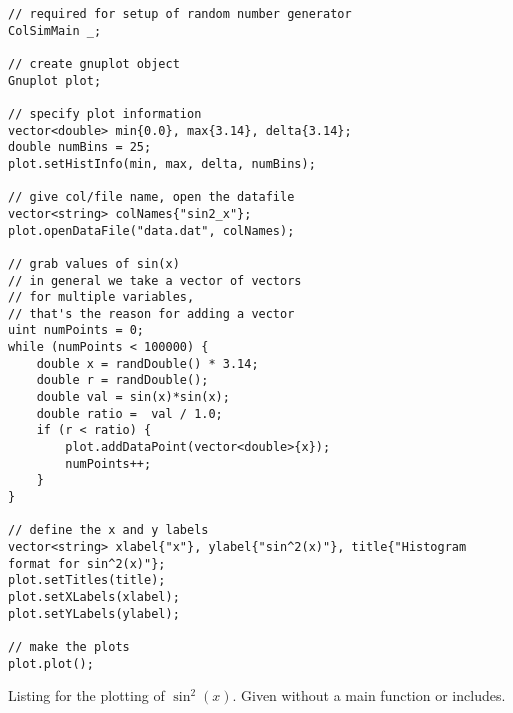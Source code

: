\begin{listing}[ht!]
\begin{verbatim}
// required for setup of random number generator
ColSimMain _;

// create gnuplot object
Gnuplot plot;

// specify plot information
vector<double> min{0.0}, max{3.14}, delta{3.14};
double numBins = 25;
plot.setHistInfo(min, max, delta, numBins);

// give col/file name, open the datafile
vector<string> colNames{"sin2_x"};
plot.openDataFile("data.dat", colNames);

// grab values of sin(x)
// in general we take a vector of vectors
// for multiple variables,
// that's the reason for adding a vector
uint numPoints = 0;
while (numPoints < 100000) {
	double x = randDouble() * 3.14;
	double r = randDouble();
	double val = sin(x)*sin(x);
	double ratio =  val / 1.0;
	if (r < ratio) {
	    plot.addDataPoint(vector<double>{x});
		numPoints++;
	}
}
	
// define the x and y labels
vector<string> xlabel{"x"}, ylabel{"sin^2(x)"}, title{"Histogram format for sin^2(x)"};
plot.setTitles(title);
plot.setXLabels(xlabel);
plot.setYLabels(ylabel);

// make the plots
plot.plot();
\end{verbatim}
\caption{Listing for the plotting of $\sin^2(x)$. Given without a main function or includes.}
\label{listing:gnuplot-testing}
\end{listing}


